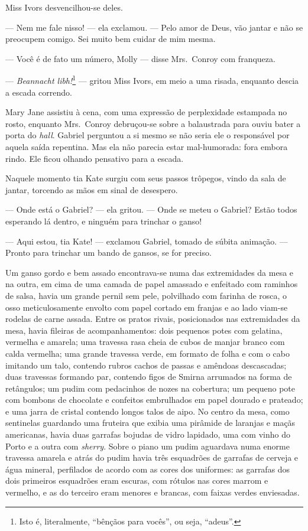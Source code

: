 Miss Ivors desvencilhou-se deles.

--- Nem me fale nisso! --- ela exclamou.  --- Pelo amor de Deus, vão jantar e
não se preocupem comigo.  Sei muito bem cuidar de mim mesma.

--- Você é de fato um número, Molly --- disse Mrs.~Conroy com franqueza.

--- \textit{Beannacht libh!}\footnote{ Isto é, literalmente, “bênçãos para
vocês”, ou seja, “adeus”.} --- gritou Miss Ivors, em meio a uma
risada, enquanto descia a escada correndo.

Mary Jane assistiu à cena, com uma expressão de perplexidade estampada no
rosto, enquanto Mrs.~Conroy debruçou-se sobre a balaustrada para ouviu bater a
porta do \textit{hall}.  Gabriel perguntou a si mesmo se não seria ele o
responsável por aquela saída repentina.  Mas ela não parecia estar
mal-humorada: fora embora rindo.  Ele ficou olhando pensativo para a escada.

Naquele momento tia Kate surgiu com seus passos trôpegos, vindo da sala de
jantar, torcendo as mãos em sinal de desespero.

--- Onde está o Gabriel? --- ela gritou.  --- Onde se meteu o Gabriel?  Estão
todos esperando lá dentro, e ninguém para trinchar o ganso!

--- Aqui estou, tia Kate! --- exclamou Gabriel, tomado de súbita animação.  ---
Pronto para trinchar um bando de gansos, se for preciso.

Um ganso gordo e bem assado encontrava-se numa das extremidades da mesa e na
outra, em cima de uma camada de papel amassado e enfeitado com raminhos de
salsa, havia um grande pernil sem pele, polvilhado com farinha de rosca, o osso
meticulosamente envolto com papel cortado em franjas e ao lado viam-se rodelas
de carne assada.  Entre os pratos rivais, posicionados nas extremidades da
mesa, havia fileiras de acompanhamentos: dois pequenos potes com gelatina,
vermelha e amarela; uma travessa rasa cheia de cubos de manjar branco com calda
vermelha; uma grande travessa verde, em formato de folha e com o cabo imitando
um talo, contendo rubros cachos de passas e amêndoas descascadas; duas
travessas formando par, contendo figos de Smirna arrumados na forma de
retângulos; um pudim com pedacinhos de nozes na cobertura; um pequeno pote com
bombons de chocolate e confeitos embrulhados em papel dourado e prateado; e uma
jarra de cristal contendo longos talos de aipo.  No centro da mesa, como
sentinelas guardando uma fruteira que exibia uma pirâmide de laranjas e maçãs
americanas, havia duas garrafas bojudas de vidro lapidado, uma com vinho do
Porto e a outra com \textit{sherry}.  Sobre o piano um pudim aguardava numa
enorme travessa amarela e atrás do pudim havia três esquadrões de garrafas de
cerveja e água mineral, perfilados de acordo com as cores dos uniformes: as
garrafas dos dois primeiros esquadrões eram escuras, com rótulos nas cores
marrom e vermelho, e as do terceiro eram menores e brancas, com faixas verdes
enviesadas.

